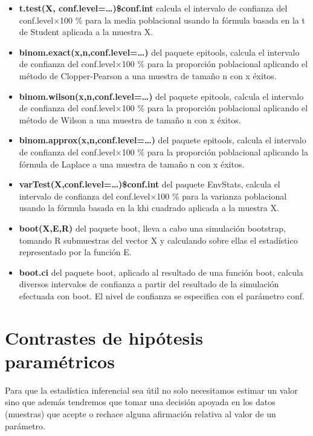 \documentclass[
]{article}
\providecommand{\tightlist}{%
  \setlength{\itemsep}{0pt}\setlength{\parskip}{0pt}}
\begin{document}
\begin{itemize}
\tightlist
\item
  \textbf{t.test(X, conf.level=\ldots)\$conf.int} calcula el intervalo
  de confianza del conf.level×100 \% para la media poblacional usando la
  fórmula basada en la t de Student aplicada a la muestra X.
\item
  \textbf{binom.exact(x,n,conf.level=\ldots)} del paquete epitools,
  calcula el intervalo de confianza del conf.level×100 \% para la
  proporción poblacional aplicando el método de Clopper-Pearson a una
  muestra de tamaño n con x éxitos.
\item
  \textbf{binom.wilson(x,n,conf.level=\ldots)} del paquete epitools,
  calcula el intervalo de confianza del conf.level×100 \% para la
  proporción poblacional aplicando el método de Wilson a una muestra de
  tamaño n con x éxitos.
\item
  \textbf{binom.approx(x,n,conf.level=\ldots)} del paquete epitools,
  calcula el intervalo de confianza del conf.level×100 \% para la
  proporción poblacional aplicando la fórmula de Laplace a una muestra
  de tamaño n con x éxitos.
\item
  \textbf{varTest(X,conf.level=\ldots)\$conf.int} del paquete EnvStats,
  calcula el intervalo de confianza del conf.level×100 \% para la
  varianza poblacional usando la fórmula basada en la khi cuadrado
  aplicada a la muestra X.
\item
  \textbf{boot(X,E,R)} del paquete boot, lleva a cabo una simulación
  bootstrap, tomando R submuestras del vector X y calculando sobre ellas
  el estadístico representado por la función E.
\item
  \textbf{boot.ci} del paquete boot, aplicado al resultado de una
  función boot, calcula diversos intervalos de confianza a partir del
  resultado de la simulación efectuada con boot. El nivel de confianza
  se especifica con el parámetro conf.
\end{itemize}

\hypertarget{contrastes-de-hipuxf3tesis-paramuxe9tricos}{%
\section{Contrastes de hipótesis
paramétricos}\label{contrastes-de-hipuxf3tesis-paramuxe9tricos}}

Para que la estadística inferencial sea útil no solo necesitamos estimar
un valor sino que además tendremos que tomar una decisión apoyada en los
datos (muestras) que acepte o rechace alguna afirmación relativa al
valor de un parámetro.
\end{document}
